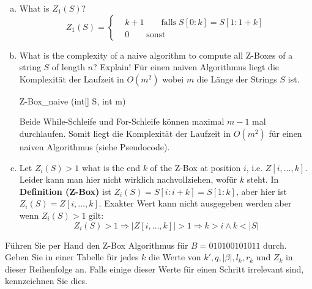 \documentclass{article}
\begin{document}
\begin{flushleft}
\begin{enumerate}[(a)]
\begin{itemize}
    \end{itemize}
    \item What is $Z_1(S)$?
    $$ Z_1(S) = \left\{
    \begin{aligned}
        & k + 1 \qquad \text{falls} \; S[0 : k] = S[1 : 1 + k] \\
        & 0 \qquad \text{sonst}
    \end{aligned}  
    \right.
    $$  
    \item What is the complexity of a naive algorithm to compute all Z-Boxes of a string $S$ of length
    $n$? Explain!
    \newline
    Für einen naiven Algorithmus liegt die Komplexität der Laufzeit in $O(m^2)$ wobei $m$ die Länge der Strings $S$ ist.
    \begin{algorithm}
        \NoCaptionOfAlgo
        \caption{Z-Box\_naive (int[] S, int m)}
    \end{algorithm}
    Beide While-Schleife und For-Schleife können maximal $m - 1$ mal durchlaufen. Somit liegt die Komplexität der Laufzeit in $O(m^2)$ 
    für einen naiven Algorithmus (siehe Pseudocode).
    \newpage
    \item Let $Z_i(S) > 1$ what is the end $k$ of the Z-Box at position $i$, i.e. $Z[i,\dots,k]$.
    \newline Leider kann man hier nicht wirklich nachvollziehen, wofür $k$ steht. In \textbf{Definition (Z-Box)} ist $Z_i(S) = S[i : i + k] = S[1 : k]$,
    aber hier ist $Z_i(S) = Z[i,\dots,k]$. Exakter Wert kann nicht ausgegeben werden aber wenn $Z_i(S) > 1$ gilt:
    \begin{equation*}
        Z_i(S) > 1 \Longrightarrow |Z[i,\dots,k]| > 1 \Longrightarrow k > i \land k < |S|
    \end{equation*} 
\end{enumerate}
Führen Sie per Hand den Z-Box Algorithmus für $B = 010100101011$ durch. Geben Sie in einer Tabelle
für jedes $k$ die Werte von $k', q, |\beta|, l_k, r_k$ und $Z_k$ in dieser Reihenfolge an. 
Falls einige dieser Werte für einen Schritt irrelevant sind, kennzeichnen Sie dies.
\newline

\end{flushleft}
\end{document}
